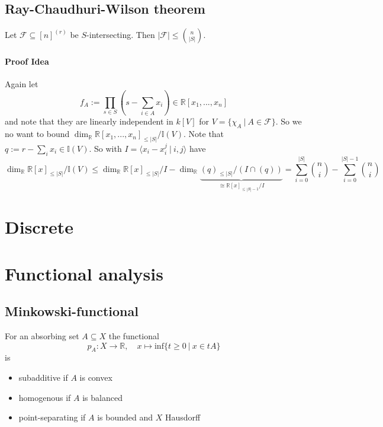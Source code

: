 \documentclass{scrartcl}
\newcommand{\R}{\mathbb{R}}
\newcommand{\I}{\mathbb{I}}
\begin{document}
\subsection{Ray-Chaudhuri-Wilson theorem}
Let $\mathcal{F} \subseteq [n]^{(r)}$ be $S$-intersecting. Then $|\mathcal{F}| \leq {n \choose |S|}$.
\paragraph{Proof Idea} Again let
\begin{equation*}
    f_A := \prod_{s \in S} (s - \sum_{i \in A} x_i) \in \R[x_1, ..., x_n]
\end{equation*}
and note that they are linearly independent in $k[V]$ for $V = \{ \chi_A \ | \ A \in \mathcal{F} \}$.
So we no want to bound $\dim_\R \R[x_1, ..., x_n]_{\leq |S|} / \I(V)$.
Note that $q := r - \sum_i x_i \in \I(V)$. So with $I = \langle x_i - x_i^j \ | \ i, j \rangle$ have
\begin{equation*}
    \dim_\R \R[x]_{\leq |S|} / \I(V) \leq \dim_\R \R[x]_{\leq |S|} / I - \dim_\R \underbrace{(q)_{\leq |S|} / (I \cap (q))}_{\cong \R[x]_{\leq |S| - 1} / I} = \sum_{i = 0}^{|S|} {n \choose i} - \sum_{i = 0}^{|S| - 1} {n \choose i}
\end{equation*}

\section{Discrete}

\section{Functional analysis}

\subsection{Minkowski-functional}
For an absorbing set $A \subseteq X$ the functional
\begin{equation}
    p_A: X \to \R, \quad x \mapsto \mathrm{inf}\{t \geq 0 \ | \ x \in tA \} \nonumber
\end{equation} is
\begin{itemize}
    \item subadditive if $A$ is convex
    \item homogenous if $A$ is balanced
    \item point-separating if $A$ is bounded and $X$ Hausdorff
\end{itemize}
\end{document}
